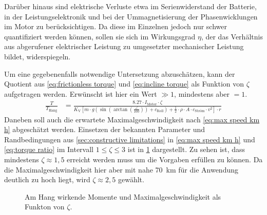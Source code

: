 		Darüber hinaus sind elektrische Verluste etwa im Serienwiderstand der Batterie, in der Leistungselektronik und bei der Ummagnetisierung der Phasenwicklungen im Motor zu berücksichtigen.
		Da diese im Einzelnen jedoch nur schwer quantifiziert werden können, sollen sie sich im Wirkungsgrad \(\eta\), der das Verhältnis aus abgerufener elektrischer Leistung zu umgesetzter mechanischer Leistung bildet, widerspiegeln.\par\medskip
		Um eine gegebenenfalls notwendige Untersetzung abzuschätzen, kann der Quotient aus \cref{eq:frictionless torque} und \cref{eq:incline torque} als Funktion von \(\zeta\) aufgetragen werden.
		Erwünscht ist hier ein Wert \(\gg 1\), mindestens aber \(= 1\).
		\begin{align}
			\frac{T}{T_\text{Hang}} &= \frac{\num{8,27} \cdot I_\text{Motor} \cdot \zeta}{K_\text{V}
			\left[ m \cdot g
				\left(\sin
					\left(\arctan
						\left(
							\frac{\angle}{100}
						\right)
					\right) + c_\text{Roll}
				\right) + \frac{1}{2} \cdot \rho \cdot A \cdot c_\text{Ström} \cdot v^2
			\right] \cdot r}%
			\label{eq:torque ratio}
		\end{align}
		Daneben soll auch die erwartete Maximalgeschwindigkeit nach \cref{eq:max speed km h} abgeschätzt werden.
		Einsetzen der bekannten Parameter und Randbedingungen aus \cref{sec:constructive limitations} in \cref{eq:max speed km h} und \cref{eq:torque ratio} im Intervall \(1 \leq \zeta \leq 3\) ist in \cref{fig:torque ratio and vmax vs zetas} dargestellt.
		Zu sehen ist, dass mindestens \(\zeta \approx 1,5\) erreicht werden muss um die Vorgaben erfüllen zu können.
		Da die Maximalgeschwindigkeit hier aber mit nahe \qty{70}{\kilo\metre} für die Anwendung deutlich zu hoch liegt, wird \(\zeta \approx 2,5\) gewählt.
		\begin{figure}[h]
			\centering
			
			\caption[Am Hang wirkende Momente und Maximalgeschwindigkeit als Funkton von \(\zeta\)]{Am Hang wirkende Momente und Maximalgeschwindigkeit als Funkton von \(\zeta\).}%
			\label{fig:torque ratio and vmax vs zetas}
		\end{figure}
		
